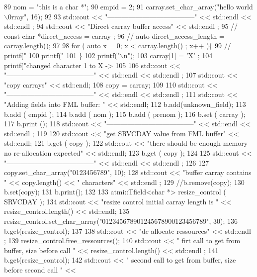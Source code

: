 \begin{DoxyCodeInclude}
89         nom = "this is a char *";
90         empid = 2;
91         carray.set\_char\_array("hello world\(\backslash\)0rray", 16);
92 
93         std::cout << "--------------------------------------" << std::endl << std::endl ;
94         std::cout << "Direct carray buffer access" << std::endl ;
95         // const char *direct\_access = carray ;
96         // auto direct\_access\_length = carray.length();
97 
98         for ( auto x = 0; x < carray.length() ; x++ )\{
99           // printf("%
100           printf("%
101         \}
102         printf("\(\backslash\)n");
103         carray[1] = 'X' ;
104         printf("changed character 1 to X -> %
105 
106         std::cout << "--------------------------------------" << std::endl << std::endl ;
107         std::cout << "copy carrays" << std::endl;
108         copy = carray;
109 
110         std::cout << "--------------------------------------" << std::endl << std::endl ;
111         std::cout << "Adding fields into FML buffer: " << std::endl;
112         b.add(unknown\_field);
113         b.add ( empid );
114         b.add ( nom );
115         b.add ( prenom );
116         b.set ( carray );
117         b.print ();
118         std::cout << "--------------------------------------" << std::endl << std::endl ;
119 
120         std::cout << "get SRVCDAY value from FML buffer" << std::endl;
121         b.get ( copy );
122         std::cout << "there should be enough memory no re-allocation expected" << std::endl;
123         b.get ( copy );
124 
125         std::cout << "--------------------------------------" << std::endl << std::endl ;
126 
127         copy.set\_char\_array("0123456789", 10);
128         std::cout << "buffer carray contains " << copy.length() << " characters" << std::endl ;
129         //b.remove(copy);
130         b.set(copy);
131         b.print();
132 
133         atmi::Tfield<char *> resize\_control ( SRVCDAY );
134         std::cout << "resize control initial carray length is  " << resize\_control.length() << std::endl;
135         resize\_control.set\_char\_array("012345678901245678900123456789", 30);
136         b.get(resize\_control);
137 
138         std::cout << "de-allocate ressources" << std::endl ;
139         resize\_control.free\_ressources();
140         std::cout << "  firt call to get from buffer, size before call " << resize\_control.length() <<
       std::endl ;
141         b.get(resize\_control);
142         std::cout << "  second call to get from buffer, size before second call " <<

\end{DoxyCodeInclude}
